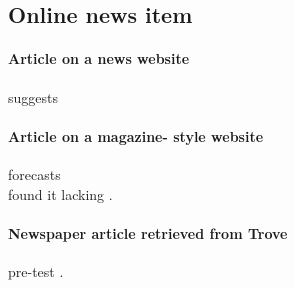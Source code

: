 \documentclass[a4paper,australian,oneside,12pt,footlines=3]{scrbook}%
\theoremstyle{remark}
\begin{document}
\begin{refsection}
\section{Online news item}
\paragraph{Article on a news website}
\textcite{Day2012} suggests\textelp{}

\paragraph{Article on a magazine- style website}
\textcite{Walsh2012} forecasts\textelp{}\\
\textelp{}found it lacking \parencite{Williams2012}.

\paragraph{Newspaper article retrieved from Trove}
\textelp{} pre-test \parencite{CanTimes1964}.
\printbibliography[heading=subbibliography]
\end{refsection}
\end{document}
